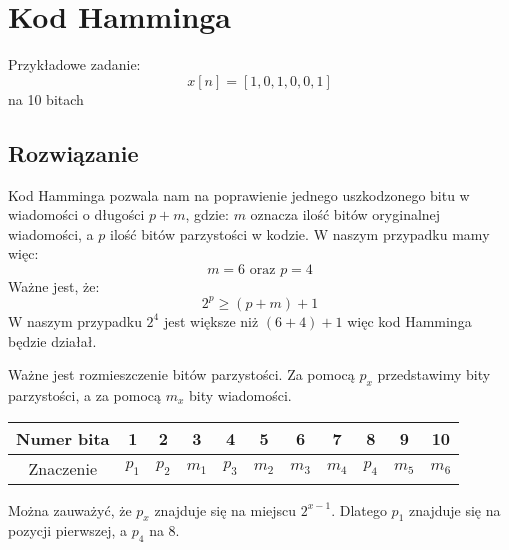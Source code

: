 \documentclass{article}
\begin{document}
\section{Kod Hamminga}
Przykładowe zadanie:
\[
    x[n]=[1,0,1,0,0,1]
\]
na 10 bitach
\subsection*{Rozwiązanie}
Kod Hamminga pozwala nam na poprawienie jednego uszkodzonego bitu w wiadomości
o długości $p + m$, gdzie: $m$ oznacza ilość bitów oryginalnej wiadomości, a $p$ ilość
bitów parzystości w kodzie. W naszym przypadku mamy więc:
\[
    m = 6 \text{ oraz } p = 4
\]
Ważne jest, że:
\[
    2^p \ge (p + m) + 1
\]
W naszym przypadku $2^4$ jest większe niż $(6 + 4) + 1$ więc kod Hamminga będzie działał.

Ważne jest rozmieszczenie bitów parzystości. Za pomocą $p_x$ przedstawimy bity
parzystości, a za pomocą $m_x$ bity wiadomości.

\begin{center}
    \begin{tabular}{|c|c|c|c|c|c|c|c|c|c|c|}
        \hline
        Numer bita & 1 & 2 & 3 & 4 & 5 & 6 & 7 & 8 & 9 & 10 \\
        \hline
        Znaczenie & $p_1$ & $p_2$ & $m_1$ & $p_3$ & $m_2$ & $m_3$ & $m_4$ & $p_4$ & $m_5$ & $m_6$ \\
        \hline
    \end{tabular}
\end{center}

Można zauważyć, że $p_x$ znajduje się na miejscu $2^{x - 1}$. Dlatego $p_1$ znajduje się
na pozycji pierwszej, a $p_4$ na 8.
\end{document}
